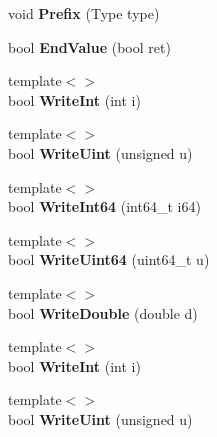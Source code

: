 \begin{DoxyCompactItemize}
\item 
void {\bfseries Prefix} (Type type)\hypertarget{class_writer_a1fc40f8b9f3abc2548c0c5782ce1755d}{}\label{class_writer_a1fc40f8b9f3abc2548c0c5782ce1755d}

\item 
bool {\bfseries End\+Value} (bool ret)\hypertarget{class_writer_adc1cadbabc309d31f19cf7463251d879}{}\label{class_writer_adc1cadbabc309d31f19cf7463251d879}

\item 
{\footnotesize template$<$$>$ }\\bool {\bfseries Write\+Int} (int i)\hypertarget{class_writer_abefb163a93b376d056edecad5a7a82ef}{}\label{class_writer_abefb163a93b376d056edecad5a7a82ef}

\item 
{\footnotesize template$<$$>$ }\\bool {\bfseries Write\+Uint} (unsigned u)\hypertarget{class_writer_a9665a4a1549b286944b21927b80060cf}{}\label{class_writer_a9665a4a1549b286944b21927b80060cf}

\item 
{\footnotesize template$<$$>$ }\\bool {\bfseries Write\+Int64} (int64\+\_\+t i64)\hypertarget{class_writer_a3528a42394d50f3b92659de517433c85}{}\label{class_writer_a3528a42394d50f3b92659de517433c85}

\item 
{\footnotesize template$<$$>$ }\\bool {\bfseries Write\+Uint64} (uint64\+\_\+t u)\hypertarget{class_writer_a025b3d2ca07d539a7067575e95f5578d}{}\label{class_writer_a025b3d2ca07d539a7067575e95f5578d}

\item 
{\footnotesize template$<$$>$ }\\bool {\bfseries Write\+Double} (double d)\hypertarget{class_writer_af317e1d24249b8c68503a6253c703bd2}{}\label{class_writer_af317e1d24249b8c68503a6253c703bd2}

\item 
{\footnotesize template$<$$>$ }\\bool {\bfseries Write\+Int} (int i)\hypertarget{class_writer_abefb163a93b376d056edecad5a7a82ef}{}\label{class_writer_abefb163a93b376d056edecad5a7a82ef}

\item 
{\footnotesize template$<$$>$ }\\bool {\bfseries Write\+Uint} (unsigned u)\hypertarget{class_writer_a9665a4a1549b286944b21927b80060cf}{}\label{class_writer_a9665a4a1549b286944b21927b80060cf}


\end{DoxyCompactItemize}
